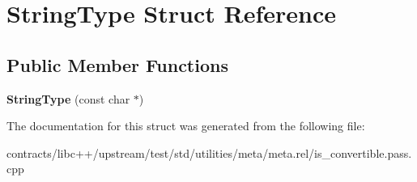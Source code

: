\hypertarget{struct_string_type}{}\section{String\+Type Struct Reference}
\label{struct_string_type}
\subsection*{Public Member Functions}
\begin{DoxyCompactItemize}
\item 
\mbox{\label{struct_string_type_ab231be133fac322a23c103d45cea27f8}} 
{\bfseries String\+Type} (const char $\ast$)
\end{DoxyCompactItemize}


The documentation for this struct was generated from the following file\+:\begin{DoxyCompactItemize}
\item 
contracts/libc++/upstream/test/std/utilities/meta/meta.\+rel/is\+\_\+convertible.\+pass.\+cpp\end{DoxyCompactItemize}

